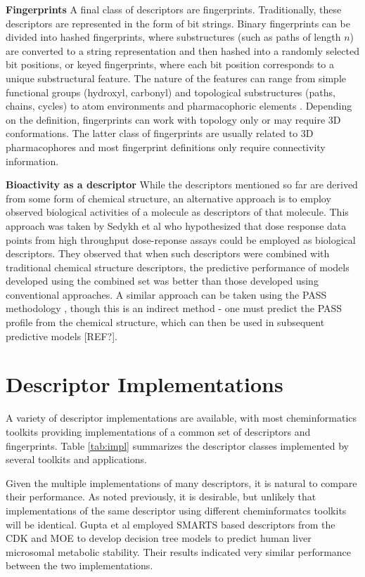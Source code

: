 \documentclass[letterpaper, 12pt]{article}
\begin{document}
\textbf{Fingerprints} A final class of descriptors are
fingerprints. Traditionally, these descriptors are represented in the
form of bit strings. Binary fingerprints can be divided into hashed
fingerprints, where substructures (such as paths of length $n$) are
converted to a string representation and then hashed into a randomly
selected bit positions, or keyed fingerprints, where each bit position
corresponds to a unique substructural feature. The nature of the
features can range from simple functional groups (hydroxyl, carbonyl)
and topological substructures (paths, chains, cycles) to atom
environments \cite{Bremser1978,Bender:2004aa} and pharmacophoric
elements \cite{Renner:2006aa}. Depending on the definition,
fingerprints can work with topology only or may require 3D
conformations. The latter class of fingerprints are usually related to
3D pharmacophores and most fingerprint definitions only require
connectivity information.

\textbf{Bioactivity as a descriptor} While the descriptors mentioned
so far are derived from some form of chemical structure, an
alternative approach is to employ observed biological activities of a
molecule as descriptors of that molecule.  This approach was taken by
Sedykh et al \cite{Sedykh:2011fk} who hypothesized that dose response
data points from high throughput dose-reponse assays could be employed
as biological descriptors. They observed that when such descriptors
were combined with traditional chemical structure descriptors, the
predictive performance of models developed using the combined set was
better than those developed using conventional approaches. A similar
approach can be taken using the PASS methodology
\cite{Poroikov:2007aa}, though this is an indirect method - one must
predict the PASS profile from the chemical structure, which can then
be used in subsequent predictive models [REF?].

\section{Descriptor Implementations}
\label{sec:descr-impl}

A variety of descriptor implementations are available, with most
cheminformatics toolkits providing implementations of a common set of
descriptors and fingerprints. Table \ref{tab:impl} summarizes the
descriptor classes implemented by several toolkits and applications. 

Given the multiple implementations of many descriptors, it is natural
to compare their performance. As noted previously, it is desirable,
but unlikely that implementations of the same descriptor using
different cheminformatcs toolkits will be identical. Gupta et al
employed SMARTS based descriptors from the CDK and MOE to develop
decision tree models to predict human liver microsomal metabolic
stability\cite{Gupta:2010uq}. Their results indicated very similar
performance between the two implementations. 
\end{document}
